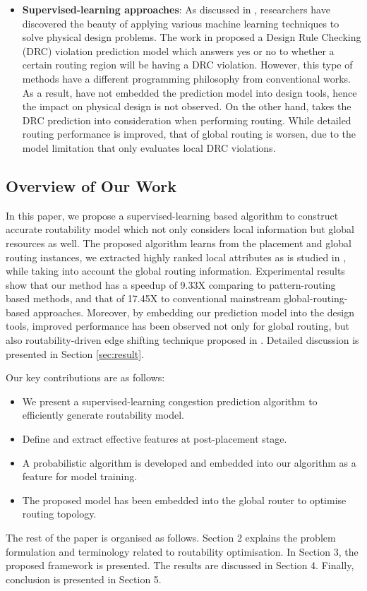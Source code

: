 \begin{itemize}
\item \textbf{Supervised-learning approaches}: As discussed in \cite{mlinphysicaldesign}, researchers have discovered the beauty of applying various machine learning techniques to solve physical design problems. The work in \cite{drcpredict18} proposed a Design Rule Checking (DRC) violation prediction model which answers yes or no to whether a certain routing region will be having a DRC violation. However, this type of methods have a different programming philosophy from conventional works. As a result, \cite{drcpredict18,drcDAT18} have not embedded the prediction model into design tools, hence the impact on physical design is not observed. On the other hand, \cite{drcingr} takes the DRC prediction into consideration when performing routing. While detailed routing performance is improved, that of global routing is worsen, due to the model limitation that only evaluates local DRC violations.
\end{itemize}


\subsection{Overview of Our Work}
In this paper, we propose a supervised-learning based algorithm to construct accurate routability model which not only considers local information but global resources as well. The proposed algorithm learns from the placement and global routing instances, we extracted highly ranked local attributes as is studied in \cite{parameterstudy}, while taking into account the global routing information. Experimental results show that our method has a speedup of 9.33X comparing to pattern-routing based methods, and that of 17.45X to conventional mainstream global-routing-based approaches. Moreover, by embedding our prediction model into the design tools, improved performance has been observed not only for global routing, but also routability-driven edge shifting technique proposed in \cite{fastroute}. Detailed discussion is presented in Section \ref{sec:result}. 

Our key contributions are as follows:
\begin{itemize}
\item We present a supervised-learning congestion prediction algorithm to efficiently generate routability model.
\item Define and extract effective features at post-placement stage.
\item A probabilistic algorithm is developed and embedded into our algorithm as a feature for model training.
\item The proposed model has been embedded into the global router to optimise routing topology.
\end{itemize}

The rest of the paper is organised as follows. Section 2 explains the problem formulation and terminology related to routability optimisation. In Section 3, the proposed framework is presented. The results are discussed in Section 4. Finally, conclusion is presented in Section 5.
